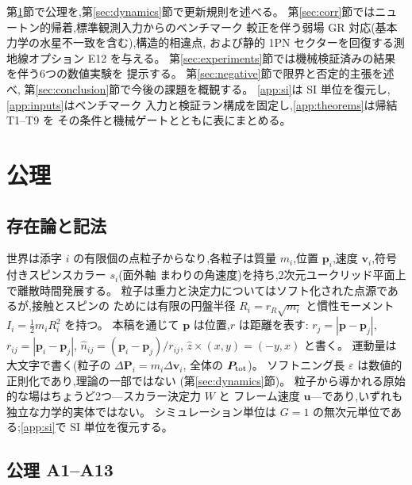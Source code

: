 \documentclass[a4paper,10pt,twocolumn]{ltjsarticle}
\newcommand{\vect}[1]{\bm{#1}}
\begin{document}
第\ref{sec:axioms}節で公理を,第\ref{sec:dynamics}節で更新規則を述べる。
第\ref{sec:corr}節ではニュートン的帰着,標準観測入力からのベンチマーク
較正を伴う弱場 GR 対応(基本力学の水星不一致を含む),構造的相違点,
および静的 1PN セクターを回復する測地線オプション E12 を与える。
第\ref{sec:experiments}節では機械検証済みの結果を伴う6つの数値実験を
提示する。
第\ref{sec:negative}節で限界と否定的主張を述べ,
第\ref{sec:conclusion}節で今後の課題を概観する。
\ref{app:si}は SI 単位を復元し,\ref{app:inputs}はベンチマーク
入力と検証ラン構成を固定し,\ref{app:theorems}は帰結 T1--T9 を
その条件と機械ゲートとともに表にまとめる。

\section{公理}
\label{sec:axioms}

\subsection{存在論と記法}

世界は添字 $i$ の有限個の点粒子からなり,各粒子は質量 $m_i$,位置
$\vect{p}_i$,速度 $\vect{v}_i$,符号付きスピンスカラー $s_i$(面外軸
まわりの角速度)を持ち,2次元ユークリッド平面上で離散時間発展する。
粒子は重力と決定力についてはソフト化された点源であるが,接触とスピンの
ためには有限の円盤半径 $R_i = r_R\sqrt{m_i}$ と慣性モーメント
$I_i = \tfrac{1}{2}m_iR_i^2$ を持つ。
本稿を通じて $\vect{p}$ は位置,$r$ は距離を表す:
$r_j = |\vect{p}-\vect{p}_j|$,
$r_{ij} = |\vect{p}_i-\vect{p}_j|$,
$\hat{n}_{ij} = (\vect{p}_i-\vect{p}_j)/r_{ij}$,
$\hat{z}\times(x,y) = (-y,x)$ と書く。
運動量は大文字で書く(粒子の $\Delta\vect{P}_i = m_i\Delta\vect{v}_i$,
全体の $\vect{P}_{\rm tot}$)。
ソフトニング長 $\varepsilon$ は数値的正則化であり,理論の一部ではない
(第\ref{sec:dynamics}節)。
粒子から導かれる原始的な場はちょうど2つ---スカラー決定力 $W$ と
フレーム速度 $\vect{u}$---であり,いずれも独立な力学的実体ではない。
シミュレーション単位は $G = 1$ の無次元単位である;\ref{app:si}で
SI 単位を復元する。

\subsection{公理 A1--A13}
\end{document}
